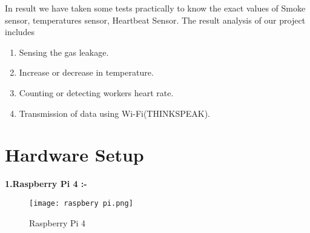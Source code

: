 \documentclass[12pt,a4paper]{report}
\begin{document}
\noindent In result we have taken some tests practically to know the exact values of Smoke sensor, temperatures sensor, Heartbeat Sensor. The result analysis of our project includes

\begin{enumerate}
\item  Sensing the gas leakage.

\item  Increase or decrease in temperature.

\item  Counting or detecting workers heart rate. 

\item  Transmission of data using Wi-Fi(THINKSPEAK).
\end{enumerate}

\noindent 


\section{ Hardware Setup}

\noindent
\newline\textbf{1.Raspberry Pi 4 :-}
\begin{figure}[htp]
    \texttt{[image: raspbery pi.png]}
    \caption{Raspberry Pi 4}
\end{figure}
\noindent 
\newline




\noindent \textbf{}

\noindent \textbf{}

\noindent \textbf{}

\noindent \textbf{}

\noindent \textbf{}

\noindent \textbf{}

\noindent \textbf{}

\noindent \textbf{}

\noindent \textbf{}

\noindent \textbf{}

\noindent \textbf{}

\noindent               

\noindent 
\end{document}
